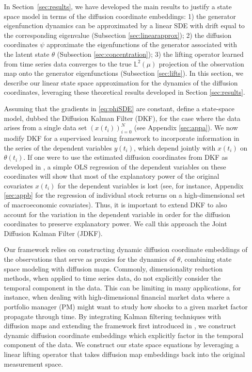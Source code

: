 \documentclass[11pt]{article}
\theoremstyle{plain}
\theoremstyle{definition}
\theoremstyle{remark}
\numberwithin{equation}{section}
\begin{document}
In Section~\ref{sec:results}, we have developed the main results to justify a state space model in terms of the diffusion coordinate embeddings: 1) the generator eigenfunction dynamics can be approximated by a linear SDE with drift equal to the corresponding eigenvalue (Subsection \ref{sec:linearapprox}); 2) the diffusion coordinates $\psi$ approximate the eigenfunctions of the generator associated with the latent state $\theta$ (Subsection \ref{sec:concentration}); 3) the lifting operator learned from time series data converges to the true $\mathbb{L}^2(\mu)$ projection of the observation map onto the generator eigenfunctions (Subsection \ref{sec:lifts}). In this section, we describe our linear state space approximation for the dynamics of the diffusion coordinates, leveraging these theoretical results developed in Section \ref{sec:results}.

Assuming that the gradients in \eqref{eq:phiSDE} are constant, \citet{shnitzer2020diffusion}
define a state-space model, dubbed the Diffusion Kalman Filter (DKF), for the case where the data arises from a single data set $(x(t_i))_{i=0}^N$ (see Appendix \ref{sec:appa}).
We now modify DKF for a supervised learning framework to incorporate information in the series of the dependent variables $y(t_i)$, which depend jointly with $x(t_i)$ on $\theta(t_i)$. If one were to use the estimated diffusion coordinates from DKF as developed in \citet{shnitzer2020diffusion}, a simple OLS regression of the dependent variables on these coordinates will show that most of the explanatory power of the original covariates $x(t_i)$ for the dependent variables is lost (see, for instance, Appendix \ref{sec:appb} for the regression of individual stock returns on a high-dimensional set of macroeconomic covariates). Thus, it is important to extend DKF to also account for the variation in the dependent variable in order for the diffusion coordinates to preserve explanatory power. We call this approach the Joint Diffusion Kalman Filter (JDKF).

Our framework relies on constructing dynamic diffusion coordinate embeddings of the observations that serve as proxies for the dynamics of $\theta$, combining state space modeling with diffusion maps. Commonly, dimensionality reduction methods, when applied to time series data, do not explicitly consider the temporal component in the data. This can be limiting in many applications, for instance, when dealing with high-dimensional financial market data where a portfolio manager (PM) might want to study how shocks to a given market factor propagate through time. By integrating Kalman filtering techniques with diffusion maps and extending the framework first introduced in \citet{shnitzer2020diffusion}, we construct dynamic diffusion coordinate embeddings which explicitly factor in the temporal component of the data. We construct our state space equations by leveraging a linear lifting operator that takes diffusion map embeddings back into the original measurement space.
\end{document}
